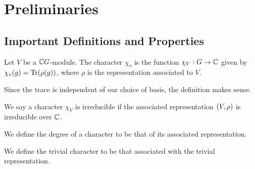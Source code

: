 \section{Preliminaries}

\subsection{Important Definitions and Properties}

\begin{boxdefinition}[Character]
    Let $V$ be a $\mathbb{C} G$-module. The character $\chi_v$ is the function $\chi_V : G \to \mathbb{C}$ given by $\chi_v(g) = \operatorname{Tr}\!\left( \rho(g) \right)$, where $\rho$ is the representation associated to $V$.
\end{boxdefinition}

\begin{remark}
    Since the trace is independent of our choice of basis, the definition makes sense.
\end{remark}

\begin{definition}[Irreducibility]
    We say a character $\chi_V$ is irreducible if the associated representation $\left( V, \rho \right)$ is irreducible over $\mathbb{C}$.
\end{definition}
\begin{definition}[Degree]
    We define the degree of a character to be that of its associated representation.
\end{definition}
\begin{definition}
    We define the trivial character to be that associated with the trivial representation.
\end{definition}

